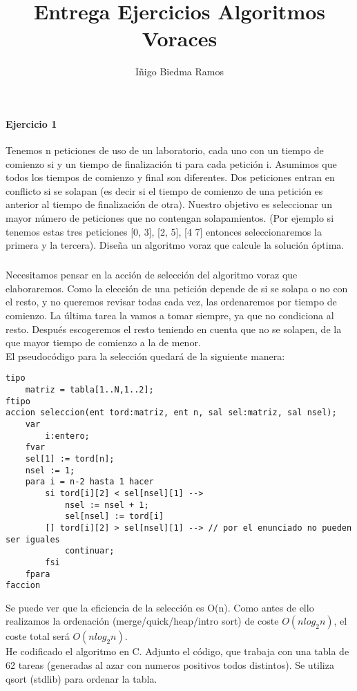 \documentclass[10pt,a4paper]{article}
\author{Iñigo Biedma Ramos}
\title{Entrega Ejercicios Algoritmos Voraces}
\date{}
\begin{document}
\maketitle
\paragraph{Ejercicio 1}
Tenemos n peticiones de uso de un laboratorio, cada uno con un tiempo de comienzo si y un tiempo de finalización ti para cada petición i. Asumimos que todos los tiempos de comienzo y final son diferentes. Dos peticiones entran en conflicto si se solapan (es decir si el tiempo de comienzo de una petición es anterior al tiempo de finalización de otra). Nuestro objetivo es seleccionar un mayor número de peticiones que no contengan solapamientos. (Por ejemplo si tenemos estas tres peticiones [0, 3], [2, 5], [4 7] entonces seleccionaremos la primera y la tercera). Diseña un algoritmo voraz que calcule la solución óptima.
\subparagraph{}
Necesitamos pensar en la acción de selección del algoritmo voraz que elaboraremos. Como la elección de una petición depende de si se solapa o no con el resto, y no queremos revisar todas cada vez, las ordenaremos por tiempo de comienzo. La última tarea la vamos a tomar siempre, ya que no condiciona al resto. Después escogeremos el resto teniendo en cuenta que no se solapen, de la que mayor tiempo de comienzo a la de menor. \\
El pseudocódigo para la selección quedará de la siguiente manera:
\begin{verbatim}
tipo
    matriz = tabla[1..N,1..2];
ftipo
accion seleccion(ent tord:matriz, ent n, sal sel:matriz, sal nsel);
    var
        i:entero;
    fvar
    sel[1] := tord[n];
    nsel := 1;
    para i = n-2 hasta 1 hacer
        si tord[i][2] < sel[nsel][1] -->
            nsel := nsel + 1;
            sel[nsel] := tord[i]
        [] tord[i][2] > sel[nsel][1] --> // por el enunciado no pueden ser iguales
            continuar;
        fsi
    fpara
faccion
\end{verbatim}
Se puede ver que la eficiencia de la selección es O(n). Como antes de ello realizamos la ordenación (merge/quick/heap/intro sort) de coste $O(n log_2 n)$, el coste total será $O(n log_2 n)$.\\
He codificado el algoritmo en C. Adjunto el código, que trabaja con una tabla de 62 tareas (generadas al azar con numeros positivos todos distintos). Se utiliza qsort (stdlib) para ordenar la tabla.
\pagebreak
\end{document}
